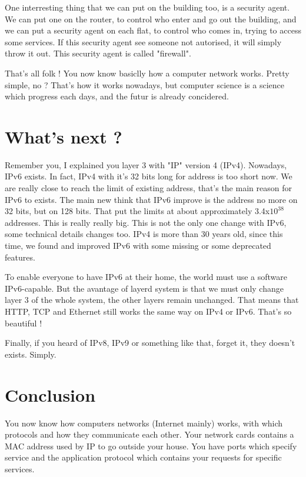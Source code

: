 \documentclass{article}
\begin{document}
	One interresting thing that we can put on the building too, is a security agent. We can put one on the router, to
	control who enter and go out the building, and we can put a security agent on each flat, to control who comes in, 
	trying to access some services. If this security agent see someone not autorised, it will simply throw it out.
	This security agent is called "firewall".
	
	That's all folk ! You now know basiclly how a computer network works. Pretty simple, no ? That's how it works
	nowadays, but computer science is a science which progress each days, and the futur is already concidered.

\section{What's next ?}
	Remember you, I explained you layer 3 with "IP" version 4 (IPv4). Nowadays, IPv6 exists. In fact, IPv4 with it's
	32 bits long for address is too short now. We are really close to reach the limit of existing address, that's the
	main reason for IPv6 to exists. The main new think that IPv6 improve is the address no more on 32 bits,
	but on 128 bits. That put the limits at about approximately 3.4x$10^{38}$ addresses. This is really really big.
	This is not the only one change with IPv6, some technical details changes too. IPv4 is more than 30 years old, 
	since this time, we found and improved IPv6 with some missing or some deprecated features.
	
	To enable everyone to have IPv6 at their home, the world must use a software IPv6-capable. But the avantage of
	layerd system is that we must only change layer 3 of the whole system, the other layers remain unchanged. That means
	that HTTP, TCP and Ethernet still works the same way on IPv4 or IPv6. That's so beautiful !
	
	Finally, if you heard of IPv8, IPv9 or something like that, forget it, they doesn't exists. Simply.

\section{Conclusion}
	You now know how computers networks (Internet mainly) works, with which protocols and how they communicate each other.
	Your network cards contains a MAC address used by IP to go outside your house. You have ports which specify service
	and the application protocol which contains your requests for specific services.
	
\end{document}
